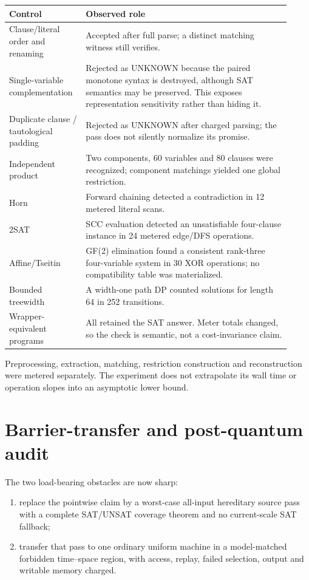 \documentclass[11pt]{article}
\begin{document}
\begin{center}\small
\begin{tabular}{p{0.24\linewidth}p{0.68\linewidth}}
\toprule
Control & Observed role\\
\midrule
Clause/literal order and renaming &
Accepted after full parse; a distinct matching witness still verifies.\\
Single-variable complementation &
Rejected as UNKNOWN because the paired monotone syntax is destroyed,
although SAT semantics may be preserved.  This exposes representation
sensitivity rather than hiding it.\\
Duplicate clause / tautological padding &
Rejected as UNKNOWN after charged parsing; the pass does not silently
normalize its promise.\\
Independent product &
Two components, 60 variables and 80 clauses were recognized; component
matchings yielded one global restriction.\\
Horn &
Forward chaining detected a contradiction in 12 metered literal scans.\\
2SAT &
SCC evaluation detected an unsatisfiable four-clause instance in 24 metered
edge/DFS operations.\\
Affine/Tseitin &
GF(2) elimination found a consistent rank-three four-variable system in 30
XOR operations; no compatibility table was materialized.\\
Bounded treewidth &
A width-one path DP counted solutions for length 64 in 252 transitions.\\
Wrapper-equivalent programs &
All retained the SAT answer.  Meter totals changed, so the check is semantic,
not a cost-invariance claim.\\
\bottomrule
\end{tabular}
\end{center}

Preprocessing, extraction, matching, restriction construction and
reconstruction were metered separately.  The experiment does not extrapolate
its wall time or operation slopes into an asymptotic lower bound.

\section{Barrier-transfer and post-quantum audit}

The two load-bearing obstacles are now sharp:
\begin{enumerate}[leftmargin=1.6em]
\item replace the pointwise claim by a worst-case all-input hereditary
source pass with a complete SAT/UNSAT coverage theorem and no current-scale
SAT fallback;
\item transfer that pass to one ordinary uniform machine in a
model-matched forbidden time--space region, with access, replay, failed
selection, output and writable memory charged.
\end{enumerate}
\end{document}
